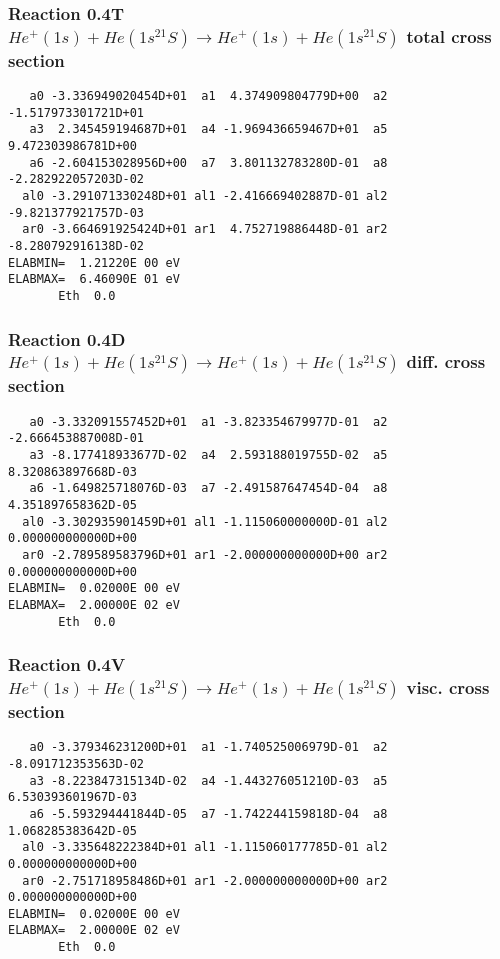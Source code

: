 \documentclass[12pt,dvipdfmx]{article}
\begin{document}
\subsubsection{
Reaction 0.4T   $  He^+(1s) + He(1s^21S) \rightarrow He^+(1s) + He(1s^21S) $  total cross section
}



\begin{small}\begin{verbatim}
   a0 -3.336949020454D+01  a1  4.374909804779D+00  a2 -1.517973301721D+01
   a3  2.345459194687D+01  a4 -1.969436659467D+01  a5  9.472303986781D+00
   a6 -2.604153028956D+00  a7  3.801132783280D-01  a8 -2.282922057203D-02
  al0 -3.291071330248D+01 al1 -2.416669402887D-01 al2 -9.821377921757D-03
  ar0 -3.664691925424D+01 ar1  4.752719886448D-01 ar2 -8.280792916138D-02
ELABMIN=  1.21220E 00 eV
ELABMAX=  6.46090E 01 eV
       Eth  0.0
\end{verbatim}\end{small}

\subsubsection{
Reaction 0.4D    $He^+(1s) + He(1s^21S) \rightarrow He^+(1s) + He(1s^21S)$   diff. cross section
}


\begin{small}\begin{verbatim}
   a0 -3.332091557452D+01  a1 -3.823354679977D-01  a2 -2.666453887008D-01
   a3 -8.177418933677D-02  a4  2.593188019755D-02  a5  8.320863897668D-03
   a6 -1.649825718076D-03  a7 -2.491587647454D-04  a8  4.351897658362D-05
  al0 -3.302935901459D+01 al1 -1.115060000000D-01 al2  0.000000000000D+00
  ar0 -2.789589583796D+01 ar1 -2.000000000000D+00 ar2  0.000000000000D+00
ELABMIN=  0.02000E 00 eV
ELABMAX=  2.00000E 02 eV
       Eth  0.0
\end{verbatim}\end{small}


\subsubsection{
Reaction 0.4V   $  He^+(1s) + He(1s^21S) \rightarrow He^+(1s) + He(1s^21S) $  visc. cross section
}



\begin{small}\begin{verbatim}
   a0 -3.379346231200D+01  a1 -1.740525006979D-01  a2 -8.091712353563D-02
   a3 -8.223847315134D-02  a4 -1.443276051210D-03  a5  6.530393601967D-03
   a6 -5.593294441844D-05  a7 -1.742244159818D-04  a8  1.068285383642D-05
  al0 -3.335648222384D+01 al1 -1.115060177785D-01 al2  0.000000000000D+00
  ar0 -2.751718958486D+01 ar1 -2.000000000000D+00 ar2  0.000000000000D+00
ELABMIN=  0.02000E 00 eV
ELABMAX=  2.00000E 02 eV
       Eth  0.0
\end{verbatim}\end{small}
\end{document}
